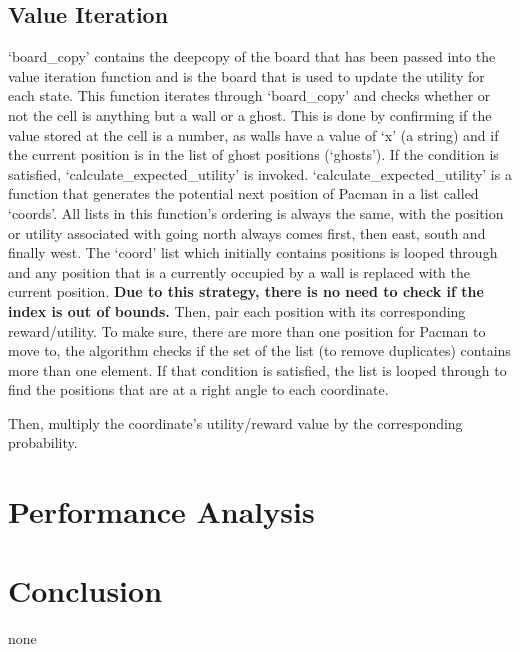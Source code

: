 \documentclass[a4paper]{report}
\begin{document}
      \subsection*{Value Iteration}
        `board\_copy' contains the deepcopy of the board that has been passed into the value iteration function and is the board that is used to update the utility for each state.
        \newline \newline
        This function iterates through `board\_copy' and checks whether or not the cell is anything but a wall or a ghost. This is done by confirming if the value stored at the cell is a number, as walls have a value of `x' (a string) and if the current position is in the list of ghost positions (`ghosts'). If the condition is satisfied, `calculate\_expected\_utility' is invoked.
        \newline \newline
        `calculate\_expected\_utility' is a function that generates the potential next position of Pacman in a list called `coords'. All lists in this function's ordering is always the same, with the position or utility associated with going north always comes first, then east, south and finally west. The `coord' list which initially contains positions is looped through and any position that is a currently occupied by a wall is replaced with the current position. \textbf{Due to this strategy, there is no need to check if the index is out of bounds.} Then, pair each position with its corresponding reward/utility. To make sure, there are more than one position for Pacman to move to, the algorithm checks if the set of the list (to remove duplicates) contains more than one element. If that condition is satisfied, the list is looped through to find the positions that are at a right angle to each coordinate.

        Then, multiply the coordinate's utility/reward value by the corresponding probability.



  \section*{Performance Analysis}


  \section*{Conclusion}
  none
\end{document}
